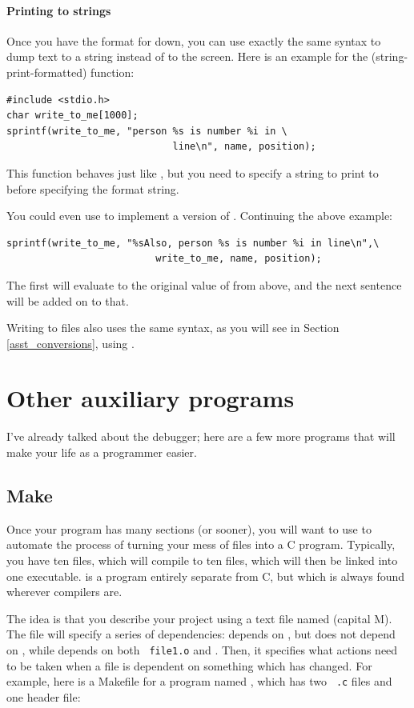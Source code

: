 \documentclass[12pt]{article}
\makeatletter
\def\ttind#1{\index{#1@\cinline{#1}}\cinline{#1}}
\makeatother
\begin{document}
\paragraph{Printing to strings} Once you have the format for  down, you can use exactly the
same syntax to dump text to a string instead of to the screen. Here is an example for the 
(string-print-formatted) function:
\begin{lstlisting}
#include <stdio.h>
char write_to_me[1000];
sprintf(write_to_me, "person %s is number %i in \
                             line\n", name, position);
\end{lstlisting}
This function behaves just like , but you need to specify
a string to print to before specifying the format string. 

You could even use  to implement a version of . Continuing the above example:
\begin{lstlisting}
sprintf(write_to_me, "%sAlso, person %s is number %i in line\n",\
                          write_to_me, name, position);
\end{lstlisting}
The first  will evaluate to the original value of  from above, and the next
sentence will be added on to that.

Writing to files also uses the same syntax, as you will see in Section \ref{asst_conversions}, using \ttind{fprintf}.

\section{Other auxiliary programs} I've already talked about the debugger; here
are a few more programs that will make your life as a programmer easier.

\subsection{Make} \label{make} 
Once your program has many sections (or sooner), you will want to use
 to automate the process of turning your mess of files into
a C program. Typically, you have ten  files, which will compile
to ten  files, which will then be linked into one executable.
  is a program entirely separate from C, but which
is always found wherever compilers are.

The idea is that you describe your project using a
text file named  (capital M). The file will specify a
series of dependencies:  depends on , but does
not depend on , while  depends on both {\tt
file1.o} and .  Then, it specifies what actions need to be taken
when a file is dependent on something which has changed.  For example,
here is a Makefile for a program named , which has two {\tt
.c} files and one header file:
\end{document}
